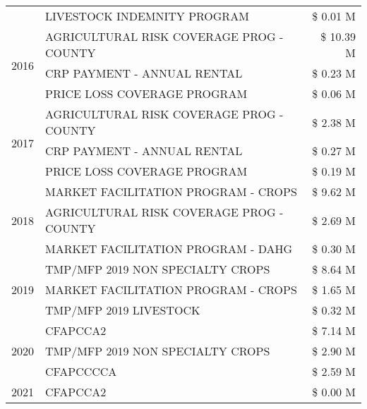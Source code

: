 \begin{tabular}{llr}
 & LIVESTOCK INDEMNITY PROGRAM & \$ 0.01 M \\
\cline{1-3}
\multirow[t]{3}{*}{2016} & AGRICULTURAL RISK COVERAGE PROG - COUNTY      & \$ 10.39 M \\
 & CRP PAYMENT - ANNUAL RENTAL                   & \$ 0.23 M \\
 & PRICE LOSS COVERAGE PROGRAM                   & \$ 0.06 M \\
\cline{1-3}
\multirow[t]{3}{*}{2017} & AGRICULTURAL RISK COVERAGE PROG - COUNTY & \$ 2.38 M \\
 & CRP PAYMENT - ANNUAL RENTAL & \$ 0.27 M \\
 & PRICE LOSS COVERAGE PROGRAM & \$ 0.19 M \\
\cline{1-3}
\multirow[t]{3}{*}{2018} & MARKET FACILITATION PROGRAM - CROPS & \$ 9.62 M \\
 & AGRICULTURAL RISK COVERAGE PROG - COUNTY & \$ 2.69 M \\
 & MARKET FACILITATION PROGRAM - DAHG & \$ 0.30 M \\
\cline{1-3}
\multirow[t]{3}{*}{2019} & TMP/MFP 2019 NON SPECIALTY CROPS & \$ 8.64 M \\
 & MARKET FACILITATION PROGRAM - CROPS & \$ 1.65 M \\
 & TMP/MFP 2019 LIVESTOCK & \$ 0.32 M \\
\cline{1-3}
\multirow[t]{3}{*}{2020} & CFAPCCA2 & \$ 7.14 M \\
 & TMP/MFP 2019 NON SPECIALTY CROPS & \$ 2.90 M \\
 & CFAPCCCCA & \$ 2.59 M \\
\cline{1-3}
2021 & CFAPCCA2 & \$ 0.00 M \\
\cline{1-3}
\bottomrule
\end{tabular}
